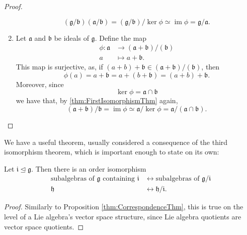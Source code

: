 \documentclass{article}
\DeclareMathOperator{\im}{im}
\newcommand*\frka{{\ensuremath{\mathfrak{a}}}}
\newcommand*\frkb{{\ensuremath{\mathfrak{b}}}}
\newcommand*\frkg{{\ensuremath{\mathfrak{g}}}}
\newcommand*\frkh{{\ensuremath{\mathfrak{h}}}}
\newcommand*\frki{{\ensuremath{\mathfrak{i}}}}
\begin{document}
\begin{proof}
\begin{enumerate}[label=(\alph*)]
            \[
                (\frkg/\frkb)(\frka/\frkb)
                =
                (\frkg/\frkb)/\ker\phi
                \simeq
                \im\phi
                =
                \frkg/\frka.
            \]
        \item 
            Let $\frka$ and $\frkb$ be ideals of $\frkg$.
            Define the map
            \begin{align*}
                \phi:
                \frka 
                &\to 
                (\frka+\frkb)/(\frkb)
                \\
                a
                &\mapsto
                a + \frkb.
            \end{align*}
            This map is surjective, as, if $(a + b) + \frkb \in (\frka+\frkb)/(\frkb)$, then
            \[
                \phi(a)
                =
                a + \frkb
                =
                a + (b + \frkb)
                =
                (a + b) + \frkb.
            \]
            Moreover, since
            \[
                \ker \phi
                =
                \frka \cap \frkb
            \]
            we have that, by \ref{thm:FirstIsomorphismThm} again,
            \[
                (\frka+\frkb)/\frkb
                =
                \im \phi
                \simeq
                \frka/\ker\phi
                =
                \frka/(\frka \cap \frkb).
            \]
    \end{enumerate}
\end{proof}

We have a useful theorem, usually considered a consequence of the third isomorphism theorem, which is important enough to state on its own:

\begin{theorem}
    \label{thm:CorrespondenceThm}
    Let $\frki \trianglelefteq \frkg$.
    Then there is an order isomorphism  
    \begin{align*}
        \text{subalgebras of $\frkg$ containing $\frki$}
        &\leftrightarrow
        \text{subalgebras of $\frkg/\frki$}
        \\
        \frkh
        &\leftrightarrow
        \frkh/\frki.
    \end{align*}
\end{theorem}

\begin{proof}
    Similarly to Proposition \ref{thm:CorrespondenceThm}, this is true on the level of a Lie algebra's vector space structure, since Lie algebra quotients are vector space quotients.
\end{proof}
\end{document}
